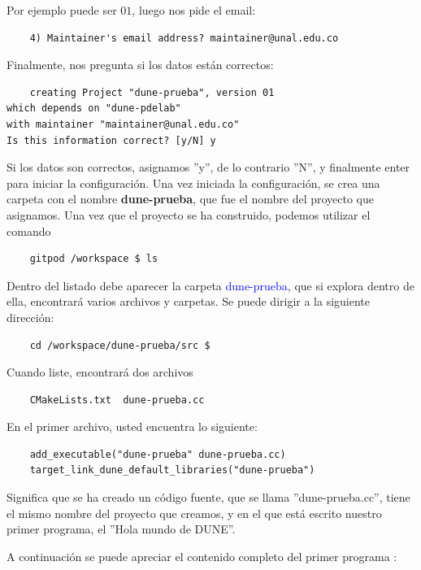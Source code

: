 Por ejemplo puede ser $01$, luego nos pide el email:
\begin{verbatim}
	4) Maintainer's email address? maintainer@unal.edu.co 
\end{verbatim}
Finalmente, nos pregunta si los datos están correctos:
\begin{verbatim}
	creating Project "dune-prueba", version 01 
which depends on "dune-pdelab"
with maintainer "maintainer@unal.edu.co"
Is this information correct? [y/N] y
\end{verbatim}
Si los datos son correctos, asignamos ''y'', de lo contrario ''N'', y finalmente enter para iniciar la configuración. Una vez iniciada la configuración,
se crea una carpeta con el nombre \textbf{dune-prueba}, que fue el nombre del proyecto que asignamos.  Una vez que
el proyecto se ha construido, podemos utilizar el comando \begin{verbatim}
	gitpod /workspace $ ls
\end{verbatim}
Dentro del listado debe aparecer la carpeta \textcolor{blue}{dune-prueba}, que si explora dentro de ella, encontrará
varios archivos y carpetas.  Se puede dirigir a la siguiente dirección: {\begin{verbatim}
	cd /workspace/dune-prueba/src $ 
\end{verbatim}}Cuando liste, encontrará dos archivos \begin{verbatim}
	CMakeLists.txt  dune-prueba.cc
\end{verbatim}
En el primer archivo, usted encuentra lo siguiente:
\begin{verbatim}
	add_executable("dune-prueba" dune-prueba.cc)
	target_link_dune_default_libraries("dune-prueba")
\end{verbatim}
Significa que se ha creado un código fuente, que se llama ''dune-prueba.cc'', tiene el mismo nombre del proyecto que
creamos, y en el que está escrito nuestro primer programa, el ''Hola mundo de DUNE''.

A continuación se puede apreciar el contenido completo del primer programa :
\begin{listing}
	\inputminted{cpp}{../../src/dune-learn.cc}
\end{listing}
